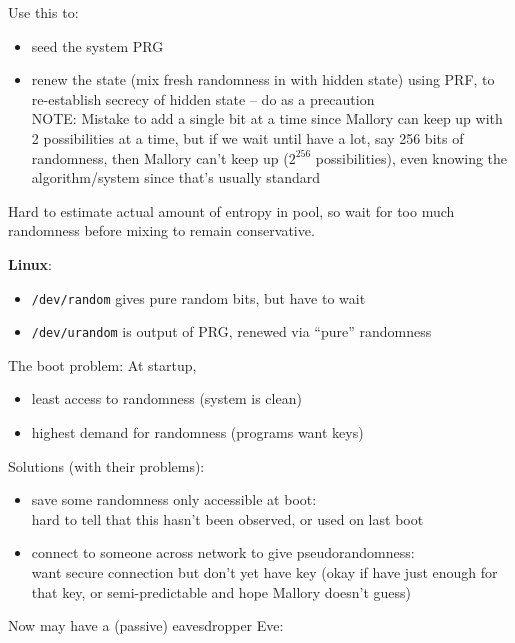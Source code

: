  Use this to:
\begin{itemize}
    \item seed the system PRG
    \item renew the state (mix fresh randomness in with hidden state) using PRF,
        to re-establish secrecy of hidden state -- do as a precaution\\

        NOTE: Mistake to add a single bit at a time since Mallory can keep
        up with 2 possibilities at a time, but if we wait until have a
        lot, say 256 bits of randomness, then Mallory can't keep up ($2^{256}$
        possibilities), even knowing the algorithm/system since that's usually
        standard
\end{itemize}

Hard to estimate actual amount of entropy in pool, so wait for too
much randomness before mixing to remain conservative.

{\bf Linux}:
\begin{itemize}
    \item {\tt /dev/random} gives pure random bits, but have to wait
    \item {\tt /dev/urandom} is output of PRG, renewed via ``pure'' randomness
\end{itemize}

The boot problem: At startup,
\begin{itemize}
    \item least access to randomness (system is clean)
    \item highest demand for randomness (programs want keys)
\end{itemize}

Solutions (with their problems):
\begin{itemize}
    \item save some randomness only accessible at boot:\\
        hard to tell that this hasn't been observed, or used on last boot
    \item connect to someone across network to give pseudorandomness:\\
        want secure connection but don't yet have key (okay if have just enough
        for that key, or semi-predictable and hope Mallory doesn't guess)
\end{itemize}

Now may have a (passive) eavesdropper Eve:\\
\\
\makebox[5cm]{$\downarrow$}\\
\\

